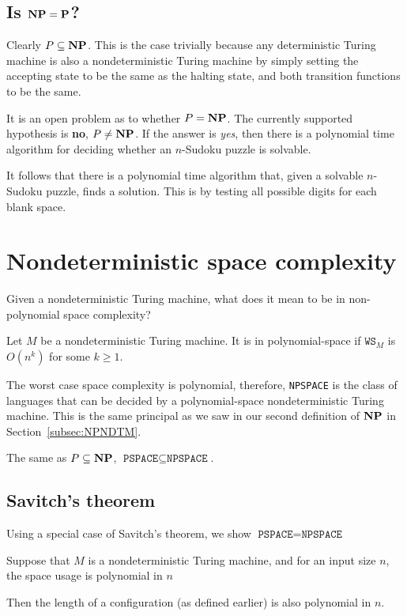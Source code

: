 \documentclass{article}
\begin{document}
\subsection{Is $\bf{NP} = P$?}

Clearly $P \subseteq \bf{NP}$. This is the case trivially because any deterministic Turing machine is also a nondeterministic Turing machine by simply setting the accepting state to be the same as the halting state, and both transition functions to be the same.

It is an open problem as to whether $P = \bf{NP}$. The currently supported hypothesis is \textbf{no}, $P \neq \bf{NP}$. If the answer is \textit{yes}, then there is a polynomial time algorithm for deciding whether an $n$-Sudoku puzzle is solvable.

It follows that there is a polynomial time algorithm that, given a solvable $n$-Sudoku puzzle, finds a solution. This is by testing all possible digits for each blank space.


\section{Nondeterministic space complexity}

Given a nondeterministic Turing machine, what does it mean to be in non-polynomial space complexity?

Let $M$ be a nondeterministic Turing machine. It is in polynomial-space if $\texttt{WS}_{M}$ is $O(n^{k})$ for some $k \geq 1$.

The worst case space complexity is polynomial, therefore, \texttt{NPSPACE} is the class of languages that can be decided by a polynomial-space nondeterministic Turing machine. This is the same principal as we saw in our second definition of $\bf{NP}$ in Section~\ref{subsec:NPNDTM}.

The same as $P \subseteq \bf{NP}$, $\texttt{PSPACE} \subseteq \texttt{NPSPACE}  $.

\subsection{Savitch's theorem}

Using a special case of Savitch's theorem, we show $\texttt{PSPACE} = \texttt{NPSPACE}  $

Suppose that $M$ is a nondeterministic Turing machine, and for an input size $n$, the space usage is polynomial in $n$

Then the length of a configuration (as defined earlier) is also polynomial in $n$.
\end{document}
